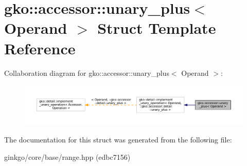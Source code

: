 \hypertarget{structgko_1_1accessor_1_1unary__plus}{}\section{gko\+:\+:accessor\+:\+:unary\+\_\+plus$<$ Operand $>$ Struct Template Reference}
\label{structgko_1_1accessor_1_1unary__plus}


Collaboration diagram for gko\+:\+:accessor\+:\+:unary\+\_\+plus$<$ Operand $>$\+:
\nopagebreak
\begin{figure}[H]
\begin{center}
\leavevmode
\includegraphics[width=350pt]{structgko_1_1accessor_1_1unary__plus__coll__graph}
\end{center}
\end{figure}


The documentation for this struct was generated from the following file\+:\begin{DoxyCompactItemize}
\item 
ginkgo/core/base/range.\+hpp (edbc7156)\end{DoxyCompactItemize}
